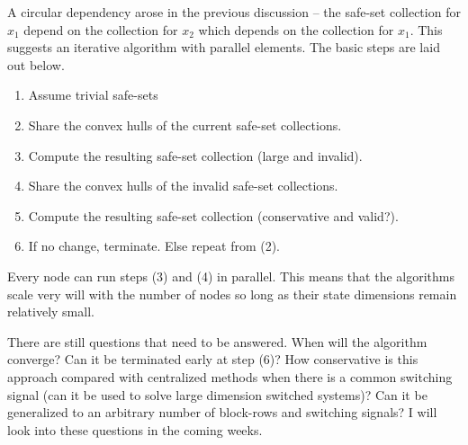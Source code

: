 A circular dependency arose in the previous discussion -- the safe-set collection for $x_1$ depend on the collection for $x_2$ which depends on the collection for $x_1$. This suggests an iterative algorithm with parallel elements. The basic steps are laid out below.
\begin{enumerate}
	\item Assume trivial safe-sets
	\item Share the convex hulls of the current safe-set collections.
	\item Compute the resulting safe-set collection (large and invalid).
	\item Share the convex hulls of the invalid safe-set collections.
	\item Compute the resulting safe-set collection (conservative and valid?).
	\item If no change, terminate. Else repeat from (2).
\end{enumerate} 
Every node can run steps (3) and (4) in parallel. This means that the algorithms scale very will with the number of nodes so long as their state dimensions remain relatively small.

There are still questions that need to be answered. When will the algorithm converge? Can it be terminated early at step (6)? How conservative is this approach compared with centralized methods when there is a common switching signal (can it be used to solve large dimension switched systems)? Can it be generalized to an arbitrary number of block-rows and switching signals? I will look into these questions in the coming weeks.
